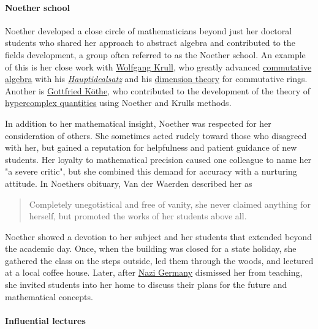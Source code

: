 \paragraph{Noether school}\label{Noether_school}

Noether developed a close circle of mathematicians beyond just her doctoral students who shared her approach to abstract algebra and contributed to the field\textquotesingle s development, a group often referred to as the Noether school. An example of this is her close work with \href{https://en.wikipedia.org/wiki/Wolfgang_Krull}{Wolfgang Krull}, who greatly advanced \href{https://en.wikipedia.org/wiki/Commutative_algebra}{commutative algebra} with his \href{https://en.wikipedia.org/wiki/Krull's_principal_ideal_theorem}{\emph{Hauptidealsatz}} and his \href{https://en.wikipedia.org/wiki/Krull_dimension}{dimension theory} for commutative rings. Another is \href{https://en.wikipedia.org/wiki/Gottfried_Köthe}{Gottfried Köthe}, who contributed to the development of the theory of \href{https://en.wikipedia.org/wiki/Hypercomplex_number}{hypercomplex quantities} using Noether and Krull\textquotesingle s methods.

In addition to her mathematical insight, Noether was respected for her consideration of others. She sometimes acted rudely toward those who disagreed with her, but gained a reputation for helpfulness and patient guidance of new students. Her loyalty to mathematical precision caused one colleague to name her "a severe critic", but she combined this demand for accuracy with a nurturing attitude. In Noether\textquotesingle s obituary, Van der Waerden described her as

\begin{quote}
Completely unegotistical and free of vanity, she never claimed anything for herself, but promoted the works of her students above all.
\end{quote}

Noether showed a devotion to her subject and her students that extended beyond the academic day. Once, when the building was closed for a state holiday, she gathered the class on the steps outside, led them through the woods, and lectured at a local coffee house. Later, after \href{https://en.wikipedia.org/wiki/Nazi_Germany}{Nazi Germany} dismissed her from teaching, she invited students into her home to discuss their plans for the future and mathematical concepts.


\paragraph{Influential lectures}\label{Influential_lectures}

